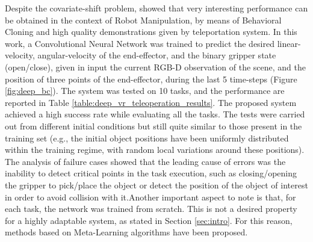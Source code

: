 Despite the covariate-shift problem, \cite{zhang2018deep_vr_teleoperation} showed that very interesting performance can be obtained in the context of Robot Manipulation, by means of Behavioral Cloning and high quality demonstrations given by teleportation system. In this work, a Convolutional Neural Network was trained to predict the desired linear-velocity, angular-velocity of the end-effector, and the binary gripper state (open/close), given in input the current RGB-D observation of the scene, and the position of three points of the end-effector, during the last 5 time-steps (Figure \ref{fig:deep_bc}). The system was tested on 10 tasks, and the performance are reported in Table \ref{table:deep_vr_teleoperation_results}. The proposed system achieved a high success rate while evaluating all the tasks. The tests were carried out from different initial conditions but still quite similar to those present in the training set (e.g., the initial object positions have been uniformly distributed within the training regime, with random local variations around these positions). The analysis of failure cases showed that the leading cause of errors was the inability to detect critical points in the task execution, such as closing/opening the gripper to pick/place the object or detect the position of the object of interest in order to avoid collision with it.\unskip Another important aspect to note is that, for each task, the network was trained from scratch. This is not a desired property for a highly adaptable system, as stated in Section \ref{sec:intro}. For this reason, methods based on Meta-Learning algorithms have been proposed.

